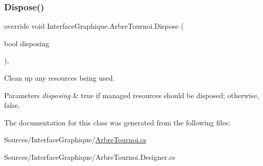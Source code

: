 \subsubsection{\texorpdfstring{Dispose()}{Dispose()}}
{\footnotesize\ttfamily override void Interface\+Graphique.\+Arbre\+Tournoi.\+Dispose (\begin{DoxyParamCaption}\item[{bool}]{disposing }\end{DoxyParamCaption})\hspace{0.3cm}{\ttfamily [inline]}, {\ttfamily [protected]}}



Clean up any resources being used. 


\begin{DoxyParams}{Parameters}
{\em disposing} & true if managed resources should be disposed; otherwise, false.\\
\hline
\end{DoxyParams}


The documentation for this class was generated from the following files\+:\begin{DoxyCompactItemize}
\item 
Sources/\+Interface\+Graphique/\hyperlink{_arbre_tournoi_8cs}{Arbre\+Tournoi.\+cs}\item 
Sources/\+Interface\+Graphique/Arbre\+Tournoi.\+Designer.\+cs\end{DoxyCompactItemize}
